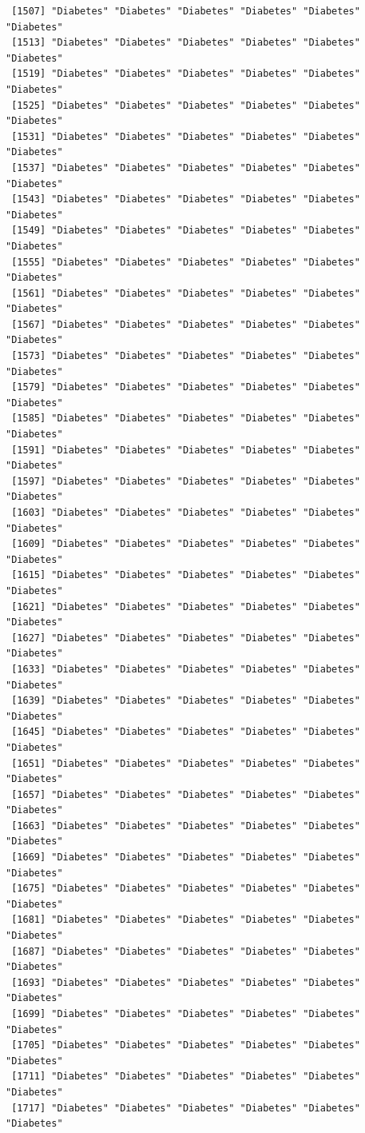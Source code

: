 \documentclass[
  letterpaper,
  DIV=11,
  numbers=noendperiod]{scrartcl}
\begin{document}
\begin{verbatim}
 [1507] "Diabetes" "Diabetes" "Diabetes" "Diabetes" "Diabetes" "Diabetes"
 [1513] "Diabetes" "Diabetes" "Diabetes" "Diabetes" "Diabetes" "Diabetes"
 [1519] "Diabetes" "Diabetes" "Diabetes" "Diabetes" "Diabetes" "Diabetes"
 [1525] "Diabetes" "Diabetes" "Diabetes" "Diabetes" "Diabetes" "Diabetes"
 [1531] "Diabetes" "Diabetes" "Diabetes" "Diabetes" "Diabetes" "Diabetes"
 [1537] "Diabetes" "Diabetes" "Diabetes" "Diabetes" "Diabetes" "Diabetes"
 [1543] "Diabetes" "Diabetes" "Diabetes" "Diabetes" "Diabetes" "Diabetes"
 [1549] "Diabetes" "Diabetes" "Diabetes" "Diabetes" "Diabetes" "Diabetes"
 [1555] "Diabetes" "Diabetes" "Diabetes" "Diabetes" "Diabetes" "Diabetes"
 [1561] "Diabetes" "Diabetes" "Diabetes" "Diabetes" "Diabetes" "Diabetes"
 [1567] "Diabetes" "Diabetes" "Diabetes" "Diabetes" "Diabetes" "Diabetes"
 [1573] "Diabetes" "Diabetes" "Diabetes" "Diabetes" "Diabetes" "Diabetes"
 [1579] "Diabetes" "Diabetes" "Diabetes" "Diabetes" "Diabetes" "Diabetes"
 [1585] "Diabetes" "Diabetes" "Diabetes" "Diabetes" "Diabetes" "Diabetes"
 [1591] "Diabetes" "Diabetes" "Diabetes" "Diabetes" "Diabetes" "Diabetes"
 [1597] "Diabetes" "Diabetes" "Diabetes" "Diabetes" "Diabetes" "Diabetes"
 [1603] "Diabetes" "Diabetes" "Diabetes" "Diabetes" "Diabetes" "Diabetes"
 [1609] "Diabetes" "Diabetes" "Diabetes" "Diabetes" "Diabetes" "Diabetes"
 [1615] "Diabetes" "Diabetes" "Diabetes" "Diabetes" "Diabetes" "Diabetes"
 [1621] "Diabetes" "Diabetes" "Diabetes" "Diabetes" "Diabetes" "Diabetes"
 [1627] "Diabetes" "Diabetes" "Diabetes" "Diabetes" "Diabetes" "Diabetes"
 [1633] "Diabetes" "Diabetes" "Diabetes" "Diabetes" "Diabetes" "Diabetes"
 [1639] "Diabetes" "Diabetes" "Diabetes" "Diabetes" "Diabetes" "Diabetes"
 [1645] "Diabetes" "Diabetes" "Diabetes" "Diabetes" "Diabetes" "Diabetes"
 [1651] "Diabetes" "Diabetes" "Diabetes" "Diabetes" "Diabetes" "Diabetes"
 [1657] "Diabetes" "Diabetes" "Diabetes" "Diabetes" "Diabetes" "Diabetes"
 [1663] "Diabetes" "Diabetes" "Diabetes" "Diabetes" "Diabetes" "Diabetes"
 [1669] "Diabetes" "Diabetes" "Diabetes" "Diabetes" "Diabetes" "Diabetes"
 [1675] "Diabetes" "Diabetes" "Diabetes" "Diabetes" "Diabetes" "Diabetes"
 [1681] "Diabetes" "Diabetes" "Diabetes" "Diabetes" "Diabetes" "Diabetes"
 [1687] "Diabetes" "Diabetes" "Diabetes" "Diabetes" "Diabetes" "Diabetes"
 [1693] "Diabetes" "Diabetes" "Diabetes" "Diabetes" "Diabetes" "Diabetes"
 [1699] "Diabetes" "Diabetes" "Diabetes" "Diabetes" "Diabetes" "Diabetes"
 [1705] "Diabetes" "Diabetes" "Diabetes" "Diabetes" "Diabetes" "Diabetes"
 [1711] "Diabetes" "Diabetes" "Diabetes" "Diabetes" "Diabetes" "Diabetes"
 [1717] "Diabetes" "Diabetes" "Diabetes" "Diabetes" "Diabetes" "Diabetes"

\end{verbatim}
\end{document}
